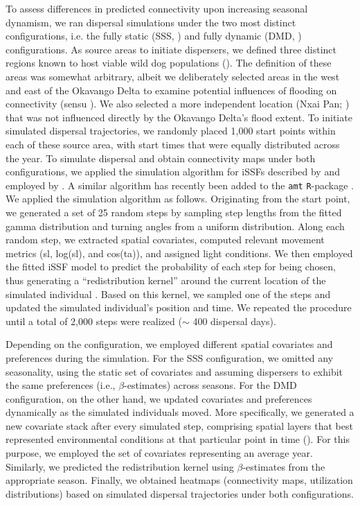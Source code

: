 \documentclass[../FinalThesis.tex]{subfiles}
\begin{document}
To assess differences in predicted connectivity upon increasing seasonal
dynamism, we ran dispersal simulations under the two most distinct
configurations, i.e. the fully static (SSS, ) and
fully dynamic (DMD, ) configurations. As source areas
to initiate dispersers, we defined three distinct regions known to host viable
wild dog populations (). The definition of these areas was
somewhat arbitrary, albeit we deliberately selected areas in the west and east
of the Okavango Delta to examine potential influences of flooding on
connectivity (sensu \citealp{Hofmann.2024}). We also selected a more
independent location (Nxai Pan; ) that was not influenced
directly by the Okavango Delta's flood extent. To initiate simulated dispersal
trajectories, we randomly placed 1,000 start points within each of these source
area, with start times that were equally distributed across the year. To
simulate dispersal and obtain connectivity maps under both configurations, we
applied the simulation algorithm for iSSFs described by \citet{Signer.2017} and
employed by \citet{Hofmann.2023}. A similar algorithm has recently been added to
the \texttt{amt} \texttt{R}-package \citep{Signer.2024}. We applied the
simulation algorithm as follows. Originating from the start point, we generated
a set of 25 random steps by sampling step lengths from the fitted gamma
distribution and turning angles from a uniform distribution. Along each random
step, we extracted spatial covariates, computed relevant movement metrics (sl,
log(sl), and cos(ta)), and assigned light conditions. We then employed the
fitted iSSF model to predict the probability of each step for being chosen, thus
generating a ``redistribution kernel'' around the current location of the
simulated individual \citep{Signer.2017, Signer.2024}. Based on this kernel, we
sampled one of the steps and updated the simulated individual's position and
time. We repeated the procedure until a total of 2,000 steps were realized
($\sim$ 400 dispersal days).

Depending on the configuration, we employed different spatial covariates and
preferences during the simulation. For the SSS configuration, we omitted any
seasonality, using the static set of covariates and assuming dispersers to
exhibit the same preferences (i.e., $\beta$-estimates) across seasons. For the
DMD configuration, on the other hand, we updated covariates and preferences
dynamically as the simulated individuals moved. More specifically, we generated
a new covariate stack after every simulated step, comprising spatial layers that
best represented environmental conditions at that particular point in time
(). For this purpose, we employed the set of covariates
representing an average year. Similarly, we predicted the redistribution kernel
using $\beta$-estimates from the appropriate season. Finally, we obtained
heatmaps (connectivity maps, utilization distributions) based on simulated
dispersal trajectories under both configurations.
\end{document}
